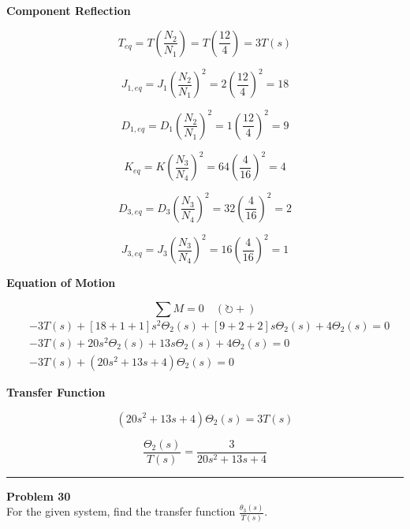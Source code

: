 \documentclass[11pt]{article}
\begin{document}
\vspace{8pt}





\noindent\textbf{Component Reflection}

\[
T_{eq} = T\left(\frac{N_2}{N_1}\right) = T\left(\frac{12}{4}\right) = 3T(s)
\]

\[
J_{1,eq} = J_1\left(\frac{N_2}{N_1}\right)^2 = 2\left(\frac{12}{4}\right)^2 = 18
\]

\[
D_{1,eq} = D_1\left(\frac{N_2}{N_1}\right)^2 = 1\left(\frac{12}{4}\right)^2 = 9
\]

\[
K_{eq} = K\left(\frac{N_3}{N_4}\right)^2 = 64\left(\frac{4}{16}\right)^2 = 4
\]

\[
D_{3,eq} = D_3\left(\frac{N_3}{N_4}\right)^2 = 32\left(\frac{4}{16}\right)^2 = 2
\]

\[
J_{3,eq} = J_3\left(\frac{N_3}{N_4}\right)^2 = 16\left(\frac{4}{16}\right)^2 = 1
\]


\newpage

\noindent\textbf{Equation of Motion}

\vspace{5pt}
\[
\sum M = 0 \quad (\circlearrowright +)
\]
\begin{align*}
& -3T(s) + [18 + 1 + 1]s^2 \Theta_2(s) + [9 + 2 + 2]s \Theta_2(s) + 4 \Theta_2(s) = 0 \\
& -3T(s) + 20s^2 \Theta_2(s) + 13s \Theta_2(s) + 4 \Theta_2(s) = 0 \\
& -3T(s) + \left(20s^2 + 13s + 4\right)\Theta_2(s) = 0
\end{align*}


\noindent\textbf{Transfer Function}

\begin{equation*}
\left(20s^2 + 13s + 4\right)\Theta_2(s) = 3T(s)
\end{equation*}

\begin{equation*}
\boxed{
\frac{\Theta_2(s)}{T(s)} = \frac{3}{20s^2 + 13s + 4}}
\end{equation*}

\newpage
  \setcounter{page}{59}  
\noindent\rule{\textwidth}{1pt}
\noindent\textbf{Problem 30} \hfill 
\\ For the given system, find the transfer function $\frac{\theta_3(s)}{T(s)}$.
\end{document}

